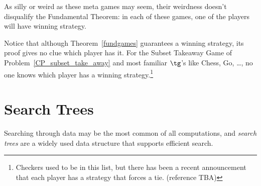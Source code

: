 \begin{definition}
As silly or weird as these meta games may seem, their weirdness
doesn't disqualify the Fundamental Theorem: in each of these games,
one of the players will have winning strategy.

Notice that although Theorem~\ref{fundgames} guarantees a winning
strategy, its proof gives no clue which player has it.  For the Subset
Takeaway Game of Problem~\ref{CP_subset_take_away} and most familiar
$\tg$'s like Chess, Go, \dots, no one knows which player has a winning
strategy.\footnote{Checkers used to be in this list, but there has
  been a recent announcement that each player has a strategy that
  forces a tie.  (reference TBA)}

\begin{problems}
\practiceproblems
{}

\homeworkproblems
{}
\end{problems}

\newcommand{\brnch}{\text{BBTr}}
\newcommand{\leafp}[1]{\text{leaf?}#1}
\newcommand{\brnchng}{\text{Branching}}
\newcommand{\leafset}{\text{Leaves}}
\newcommand{\rightsub}[1]{\text{right}#1}
\newcommand{\leftsub}[1]{\text{left}#1}
\newcommand{\rslt}[2]{\text{subtree}_{#1}#2}
\newcommand{\subbrn}[1]{\text{Subtrs}(#1)}
\newcommand{\propbrn}[1]{\text{PropSubtrs}(#1)}

\newcommand{\fintr}{\text{FinTr}}

\newcommand{\rectr}{\text{RecTr}}

\newcommand{\trdpth}[1]{\text{recdepth}#1}
\newcommand{\trsize}[1]{\text{recsize}#1}

\newcommand{\nlbl}[1]{\text{num}#1}
\newcommand{\rmin}[1]{\text{recmin}#1}

\newcommand{\trsrch}[1]{\text{srch}#1}

\section{Search Trees}

Searching through data may be the most common of all computations, and
\emph{search trees} are a widely used data structure that supports
efficient search.


\end{definition}
